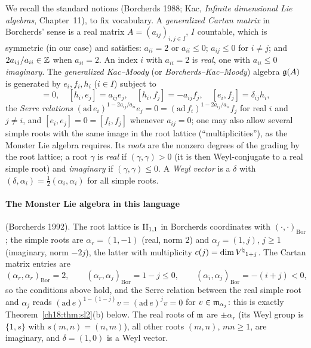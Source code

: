 We recall the standard notions (Borcherds 1988; Kac, \emph{Infinite dimensional Lie algebras}, Chapter~11), to fix
vocabulary.  A \emph{generalized Cartan matrix} in Borcherds' sense is a real matrix $A=(a_{ij})_{i,j\in I}$, $I$ countable,
which is symmetric (in our case) and satisfies: $a_{ii}=2$ or $a_{ii}\le0$; $a_{ij}\le0$ for $i\neq j$; and $2a_{ij}/a_{ii}\in{\mathbb{Z}}$ when
$a_{ii}=2$.  An index $i$ with $a_{ii}=2$ is \emph{real}, one with $a_{ii}\le0$ \emph{imaginary}.  The \emph{generalized Kac--Moody}
(or \emph{Borcherds--Kac--Moody}) algebra $\mathfrak{g}(A)$ is generated by $e_i,f_i,h_i$ ($i\in I$) subject to
\begin{equation*}
  [h_i,h_j]=0,\quad [h_i,e_j]=a_{ij}e_j,\quad [h_i,f_j]=-a_{ij}f_j,\quad [e_i,f_j]=\delta_{ij}h_i,
\end{equation*}
the \emph{Serre relations} $(\mathrm{ad}\,e_i)^{1-2a_{ij}/a_{ii}}e_j=0=(\mathrm{ad}\,f_i)^{1-2a_{ij}/a_{ii}}f_j$ for real $i$ and $j\ne i$, and
$[e_i,e_j]=0=[f_i,f_j]$ whenever $a_{ij}=0$; one may also allow several simple roots with the same image in the root lattice
(``multiplicities''), as the Monster Lie algebra requires.  Its \emph{roots} are the nonzero degrees of the grading by the root
lattice; a root $\gamma$ is \emph{real} if $(\gamma,\gamma)>0$ (it is then Weyl-conjugate to a real simple root) and \emph{imaginary} if
$(\gamma,\gamma)\le0$.  A \emph{Weyl vector} is a $\delta$ with $(\delta,\alpha_i)=\frac12(\alpha_i,\alpha_i)$ for all simple roots.

\paragraph{The Monster Lie algebra in this language} (Borcherds 1992).  The root lattice is $\mathrm{II}_{1,1}$ in Borcherds coordinates
with $(\cdot,\cdot)_{\mathrm{Bor}}$; the simple roots are $\alpha_r=(1,-1)$ (real, norm $2$) and $\alpha_j=(1,j)$, $j\ge1$ (imaginary, norm
$-2j$), the latter with multiplicity $c(j)=\dim{V^{\natural}}_{1+j}$.  The Cartan matrix entries are
\begin{equation*}
  (\alpha_r,\alpha_r)_{\mathrm{Bor}}=2,\qquad (\alpha_r,\alpha_j)_{\mathrm{Bor}}=1-j\le0,\qquad (\alpha_i,\alpha_j)_{\mathrm{Bor}}=-(i+j)<0,
\end{equation*}
so the conditions above hold, and the Serre relation between the real simple root and $\alpha_j$ reads
$(\mathrm{ad}\,e)^{1-(1-j)}v=(\mathrm{ad}\,e)^jv=0$ for $v\in\mathfrak{m}_{\alpha_j}$: this is exactly Theorem~\ref{ch18:thm:sl2}(b) below.  The real roots of $\mathfrak{m}$
are $\pm\alpha_r$ (its Weyl group is $\{1,s\}$ with $s(m,n)=(n,m)$), all other roots $(m,n)$, $mn\ge1$, are imaginary, and
$\delta=(1,0)$ is a Weyl vector.

